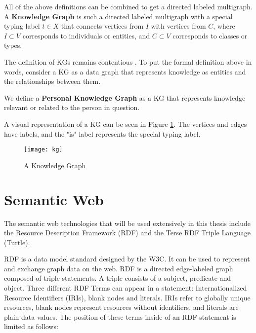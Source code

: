 \begin{definition}
    All of the above definitions can be combined to get a directed labeled multigraph.
    A \textbf{Knowledge Graph} is such a directed labeled multigraph with a special typing label $t \in X$ that connects vertices from $I$ with vertices from $C$, where $I \subset V$ corresponds to individuals or entities, and $C \subset V$ corresponds to classes or types.
\end{definition}


The definition of KGs remains contentious \cite{Hogan2021KG,commonsenseKG}. To put the formal definition above in words, consider a KG as a data graph that represents knowledge as entities and the relationships between them. 

We define a \textbf{Personal Knowledge Graph} as a KG that represents knowledge relevant or related to the person in question.

A visual representation of a KG can be seen in Figure \ref{fig:kg}. The vertices and edges have labels, and the "is" label represents the special typing label.

\begin{figure}[H]
    \centering
    \texttt{[image: kg]}
    \caption[]{A Knowledge Graph}
    \label{fig:kg}
\end{figure}







\section{Semantic Web}

The semantic web technologies that will be used extensively in this thesis include the Resource Description Framework (RDF) and the Terse RDF Triple Language (Turtle).

RDF is a data model standard designed by the W3C. It can be used to represent and exchange graph data on the web. RDF is a directed edge-labeled graph composed of triple statements. A triple consists of a subject, predicate and object. Three different RDF Terms can appear in a statement: Internationalized Resource Identifiers (IRIs), blank nodes and literals. IRIs refer to globally unique resources, blank nodes represent resources without identifiers, and literals are plain data values. The position of these terms inside of an RDF statement is limited as follows:

